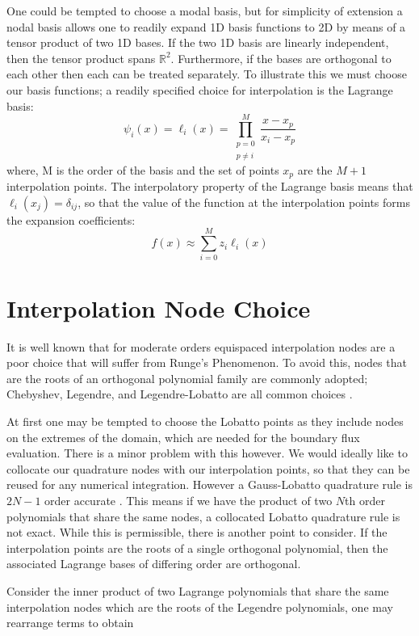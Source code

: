 \documentclass[letterpaper,12pt]{report}
\newcommand{\be}{\begin{equation}}
\newcommand{\ee}{\end{equation}}
\begin{document}
One could be tempted to choose a modal basis, but for simplicity of extension a nodal basis allows one to readily expand 1D basis functions to 2D by means of a tensor product of two 1D bases. If the two 1D basis are linearly independent, then the tensor product spans $\mathbb{R}^2$. Furthermore, if the bases are orthogonal to each other then each can be treated separately. To illustrate this we must choose our basis functions; a readily specified choice for interpolation is the Lagrange basis:
\be \psi_i(x) =\ell_i(x) = \prod_{\substack{p=0\\ p\neq i}}^M \frac{x-x_p}{x_i-x_p}\ee
where, M is the order of the basis and the set of points ${x_p}$ are the $M+1$ interpolation points. The interpolatory property of the Lagrange basis means that $\ell_i(x_j) = \delta_{ij}$, so that the value of the function at the interpolation points forms the expansion coefficients:
\be f(x) \approx \sum_{i=0}^M z_i \ell_i(x) \ee

%
\section{Interpolation Node Choice}\label{INC}
It is well known that for moderate orders equispaced interpolation nodes are a poor choice that will suffer from Runge's Phenomenon. To avoid this, nodes that are the roots of an orthogonal polynomial family are commonly adopted; Chebyshev, Legendre, and Legendre-Lobatto are all common choices \cite{Roni}. 

At first one may be tempted to choose the Lobatto points as they include nodes on the extremes of the domain, which are needed for the boundary flux evaluation. There is a minor problem with this however. We would ideally like to collocate our quadrature nodes with our interpolation points, so that they can be reused for any numerical integration. However a Gauss-Lobatto quadrature rule is $2N-1$ order accurate \cite{Roni}. This means if we have the product of two $N$th order polynomials that share the same nodes, a collocated Lobatto quadrature rule is not exact. While this is permissible, there is another point to consider. If the interpolation points are the roots of a single orthogonal polynomial, then the associated Lagrange bases of differing order are orthogonal.

Consider the inner product of two Lagrange polynomials that share the same interpolation nodes which are the roots of the Legendre polynomials, one may rearrange terms to obtain
\end{document}
